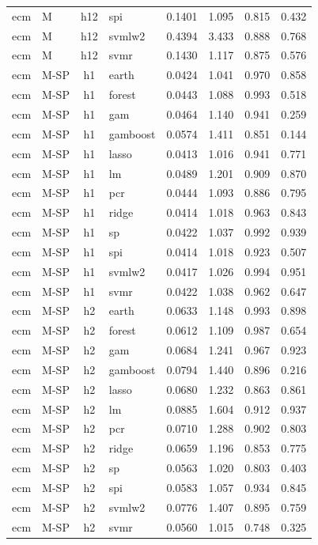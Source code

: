 \begin{ThreePartTable}
\begin{longtable}[t]{llclcccc}
ecm & M & h12 & spi & 0.1401 & 1.095 & 0.815 & 0.432\\
ecm & M & h12 & svmlw2 & 0.4394 & 3.433 & 0.888 & 0.768\\
ecm & M & h12 & svmr & 0.1430 & 1.117 & 0.875 & 0.576\\
\addlinespace
ecm & M-SP & h1 & earth & 0.0424 & 1.041 & 0.970 & 0.858\\
ecm & M-SP & h1 & forest & 0.0443 & 1.088 & 0.993 & 0.518\\
ecm & M-SP & h1 & gam & 0.0464 & 1.140 & 0.941 & 0.259\\
ecm & M-SP & h1 & gamboost & 0.0574 & 1.411 & 0.851 & 0.144\\
ecm & M-SP & h1 & lasso & 0.0413 & 1.016 & 0.941 & 0.771\\
ecm & M-SP & h1 & lm & 0.0489 & 1.201 & 0.909 & 0.870\\
ecm & M-SP & h1 & pcr & 0.0444 & 1.093 & 0.886 & 0.795\\
ecm & M-SP & h1 & ridge & 0.0414 & 1.018 & 0.963 & 0.843\\
ecm & M-SP & h1 & sp & 0.0422 & 1.037 & 0.992 & 0.939\\
ecm & M-SP & h1 & spi & 0.0414 & 1.018 & 0.923 & 0.507\\
ecm & M-SP & h1 & svmlw2 & 0.0417 & 1.026 & 0.994 & 0.951\\
ecm & M-SP & h1 & svmr & 0.0422 & 1.038 & 0.962 & 0.647\\
\addlinespace
ecm & M-SP & h2 & earth & 0.0633 & 1.148 & 0.993 & 0.898\\
ecm & M-SP & h2 & forest & 0.0612 & 1.109 & 0.987 & 0.654\\
ecm & M-SP & h2 & gam & 0.0684 & 1.241 & 0.967 & 0.923\\
ecm & M-SP & h2 & gamboost & 0.0794 & 1.440 & 0.896 & 0.216\\
ecm & M-SP & h2 & lasso & 0.0680 & 1.232 & 0.863 & 0.861\\
ecm & M-SP & h2 & lm & 0.0885 & 1.604 & 0.912 & 0.937\\
ecm & M-SP & h2 & pcr & 0.0710 & 1.288 & 0.902 & 0.803\\
ecm & M-SP & h2 & ridge & 0.0659 & 1.196 & 0.853 & 0.775\\
ecm & M-SP & h2 & sp & 0.0563 & 1.020 & 0.803 & 0.403\\
ecm & M-SP & h2 & spi & 0.0583 & 1.057 & 0.934 & 0.845\\
ecm & M-SP & h2 & svmlw2 & 0.0776 & 1.407 & 0.895 & 0.759\\
ecm & M-SP & h2 & svmr & 0.0560 & 1.015 & 0.748 & 0.325\\

\end{longtable}
\end{ThreePartTable}
